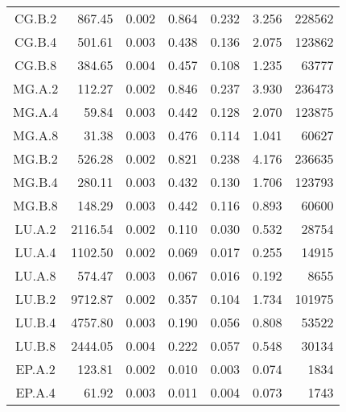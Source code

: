 \documentclass{sjtureport}
\begin{document}
\begin{ThreePartTable}
\begin{longtable}[c]{c*{6}{r}}
		CG.B.2           & 867.45                     & 0.002                      & 0.864 & 0.232 & 3.256 & 228562 \\
		CG.B.4           & 501.61                     & 0.003                      & 0.438 & 0.136 & 2.075 & 123862 \\
		CG.B.8           & 384.65                     & 0.004                      & 0.457 & 0.108 & 1.235 & 63777  \\
		MG.A.2           & 112.27                     & 0.002                      & 0.846 & 0.237 & 3.930 & 236473 \\
		MG.A.4           & 59.84                      & 0.003                      & 0.442 & 0.128 & 2.070 & 123875 \\
		MG.A.8           & 31.38                      & 0.003                      & 0.476 & 0.114 & 1.041 & 60627  \\
		MG.B.2           & 526.28                     & 0.002                      & 0.821 & 0.238 & 4.176 & 236635 \\
		MG.B.4           & 280.11                     & 0.003                      & 0.432 & 0.130 & 1.706 & 123793 \\
		MG.B.8           & 148.29                     & 0.003                      & 0.442 & 0.116 & 0.893 & 60600  \\
		LU.A.2           & 2116.54                    & 0.002                      & 0.110 & 0.030 & 0.532 & 28754  \\
		LU.A.4           & 1102.50                    & 0.002                      & 0.069 & 0.017 & 0.255 & 14915  \\
		LU.A.8           & 574.47                     & 0.003                      & 0.067 & 0.016 & 0.192 & 8655   \\
		LU.B.2           & 9712.87                    & 0.002                      & 0.357 & 0.104 & 1.734 & 101975 \\
		LU.B.4           & 4757.80                    & 0.003                      & 0.190 & 0.056 & 0.808 & 53522  \\
		LU.B.8           & 2444.05                    & 0.004                      & 0.222 & 0.057 & 0.548 & 30134  \\
		EP.A.2           & 123.81                     & 0.002                      & 0.010 & 0.003 & 0.074 & 1834   \\
		EP.A.4           & 61.92                      & 0.003                      & 0.011 & 0.004 & 0.073 & 1743   \\

\end{longtable}
\end{ThreePartTable}
\end{document}
